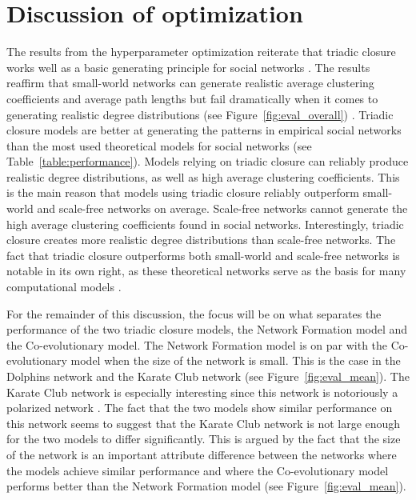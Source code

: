 \documentclass[11pt]{article}
\begin{document}
\section{Discussion of optimization}
The results from the hyperparameter optimization reiterate that triadic closure works well as a basic generating principle for social networks \cite{jacksonmeeting2007,kossinets_origins_2009,bianconi_triadic_2014}. 
The results reaffirm that small-world networks can generate realistic average clustering coefficients and average path lengths but fail dramatically when it comes to generating realistic degree distributions (see Figure~\ref{fig:eval_overall}) \cite{jacksonmeeting2007}. Triadic closure models are better at generating the patterns in empirical social networks than the most used theoretical models for social networks (see Table~\ref{table:performance}). Models relying on triadic closure can reliably produce realistic degree distributions, as well as high average clustering coefficients. This is the main reason that models using triadic closure reliably outperform small-world and scale-free networks on average. Scale-free networks cannot generate the high average clustering coefficients found in social networks. Interestingly, triadic closure creates more realistic degree distributions than scale-free networks. The fact that triadic closure outperforms both small-world and scale-free networks is notable in its own right, as these theoretical networks serve as the basis for many computational models \cite{flache_models_2017, turner_paths_2018}. 

\noindent For the remainder of this discussion, the focus will be on what separates the performance of the two triadic closure models, the Network Formation model and the Co-evolutionary model. 
The Network Formation model is on par with the Co-evolutionary model when the size of the network is small. This is the case in the Dolphins network and the Karate Club network (see Figure~\ref{fig:eval_mean}). 
The Karate Club network is especially interesting since this network is notoriously a polarized network \cite{zachary_information_1977}. 
The fact that the two models show similar performance on this network seems to suggest that the Karate Club network is not large enough for the two models to differ significantly. 
This is argued by the fact that the size of the network is an important attribute difference between the networks where the models achieve similar performance and where the Co-evolutionary model performs better than the Network Formation model (see Figure~\ref{fig:eval_mean}).
\end{document}

